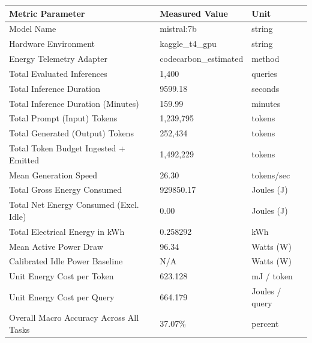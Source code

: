\begin{tabular}{lll}
\toprule
Metric Parameter & Measured Value & Unit \\
\midrule
Model Name & mistral:7b & string \\
Hardware Environment & kaggle\_t4\_gpu & string \\
Energy Telemetry Adapter & codecarbon\_estimated & method \\
Total Evaluated Inferences & 1,400 & queries \\
Total Inference Duration & 9599.18 & seconds \\
Total Inference Duration (Minutes) & 159.99 & minutes \\
Total Prompt (Input) Tokens & 1,239,795 & tokens \\
Total Generated (Output) Tokens & 252,434 & tokens \\
Total Token Budget Ingested + Emitted & 1,492,229 & tokens \\
Mean Generation Speed & 26.30 & tokens/sec \\
Total Gross Energy Consumed & 929850.17 & Joules (J) \\
Total Net Energy Consumed (Excl. Idle) & 0.00 & Joules (J) \\
Total Electrical Energy in kWh & 0.258292 & kWh \\
Mean Active Power Draw & 96.34 & Watts (W) \\
Calibrated Idle Power Baseline & N/A & Watts (W) \\
Unit Energy Cost per Token & 623.128 & mJ / token \\
Unit Energy Cost per Query & 664.179 & Joules / query \\
Overall Macro Accuracy Across All Tasks & 37.07\% & percent \\
\bottomrule
\end{tabular}


